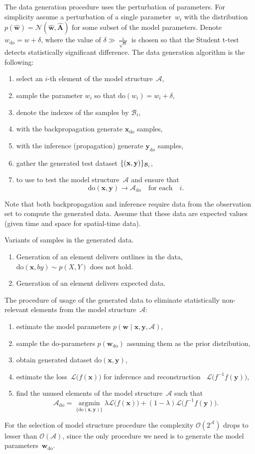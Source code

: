 \documentclass[12pt]{article}
\newcommand{\doc}{\mathrm{do}}
\newcommand{\bx}{\mathbf{x}}
\newcommand{\bw}{\mathbf{w}}
\newcommand{\by}{\mathbf{y}}
\newcommand{\bA}{\mathbf{A}}
\newcommand{\cA}{\mathcal{A}}
\newcommand{\cB}{\mathcal{B}}
\newcommand{\loss}{\mathcal{L}}
\newcommand{\cN}{\mathcal{N}}
\begin{document}
\medskip
The data generation procedure uses the perturbation of parameters. For simplicity assume a perturbation of a single parameter~$w_i$ with the distribution $p(\hat{\bw}) = \cN(\hat{\bw}, \hat{\bA})$  for some subset of the model parameters.
Denote~$w_\doc = w+\delta$, where the value of $\delta \gg \frac{\varsigma}{\sqrt{n}}$ is chosen so that the Student t-test detects statistically significant difference. 
The data generation algorithm is the following:
\begin{enumerate}[1)]
\item select an $i$-th element of the model structure~$\cA$,
\item sample the parameter $w_i$ so that $\doc(w_i) = w_i+\delta$,
\item denote the indexes of the samples by $\cB_i$,
\item with the backpropagation generate $\bx_\doc$ samples, 
\item with the inference (propagation) generate $\by_\doc$ samples, 
\item gather the generated test dataset $\{\do(\bx,\by)\}_{\cB_i}$,
\item to use to test the model structure~$\cA$ and ensure that 
\[
\doc(\bx,\by) \to \cA_\doc \quad\text{for each}\quad i.
\]
\end{enumerate}

Note that both backpropagation and inference require data from the observation set to compute the generated data. Assume that these data are expected values (given time and space for spatial-time data).

Variants of samples in the generated data. 
\begin{enumerate}
\item Generation of an element delivers outlines in the data, $ \doc(\bx,by) \sim p(X,Y)$ does not hold.
\item Generation of an element delivers expected data.
\end{enumerate}

The procedure of usage of the generated data to eliminate statistically non-relevant elements from the model structure~$\cA$:
\begin{enumerate}[1)]
\item estimate the model parameters $p(\bw\mid \bx,\by,\cA)$,
\item sample the do-parameters $p(\bw_\doc)$ assuming them as the prior distribution,
\item obtain generated dataset $\doc(\bx,\by)$,
\item estimate the loss~$\loss\bigl(f(\bx)\bigr)$ for inference and reconstruction~ $\loss\bigl(f^{-1}f(\by)\bigr)$,
\item find the unused elements of the model structure~$\cA$ such that 
\[
\cA_\doc = \mathop{\arg\min}\limits_{\{\doc(\bx,\by)\}} \lambda\loss\bigl(f(\bx)\bigr) + (1-\lambda)\loss\bigl(f^{-1}f(\by)\bigr).
\]
\end{enumerate}
For the selection of model structure procedure the complexity $\mathcal{O}(2^\cA)$ drops to lesser than $\mathcal{O}(\cA)$, since the only procedure we need is to generate the model parameters~$\bw_\doc$.
 
\end{document}
